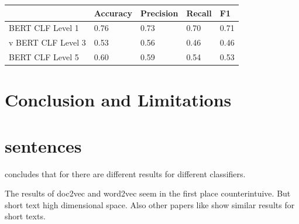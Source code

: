 \documentclass[12pt, a4paper, titlepage]{article}
\begin{document}
      \begin{table}[]
      \end{table}



\begin{table}[]
  \begin{tabular}{lllll}
  \hline
                   & Accuracy & Precision & Recall & F1   \\ \hline
  BERT CLF Level 1 & 0.76     & 0.73      & 0.70   & 0.71 \\v
  BERT CLF Level 3 & 0.53     & 0.56      & 0.46   & 0.46 \\
  BERT CLF Level 5 & 0.60     & 0.59      & 0.54   & 0.53 \\ \hline
  \end{tabular}
  \end{table}

\section{Conclusion and Limitations}
\section{sentences}
\citet{ajose2020} concludes that for there are different results for different classifiers. 

\citet{singh2022} The results of doc2vec and word2vec seem in the first place counterintuive. But short text high dimensional space. Also other papers like \citet{singh2022} show similar results for short texts.

\clearpage



    
\end{document}

